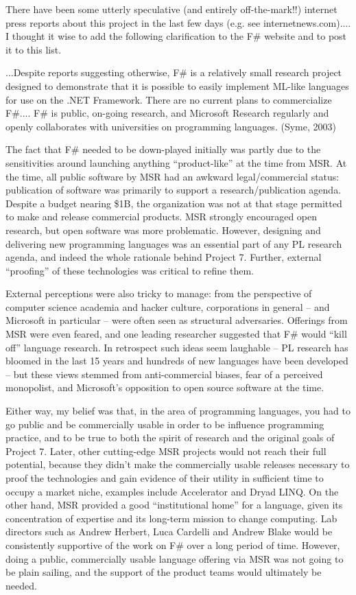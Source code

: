 \documentclass[acmsmall,review]{acmart}\settopmatter{printfolios=true,printccs=false,printacmref=false}
\begin{document}
\begin{verbquote}
There have been some utterly speculative (and entirely off-the-mark!!) internet press reports about this project in the last few days (e.g. see internetnews.com).... I thought it wise to add the following clarification to the F\# website and to post it to this list.

...Despite reports suggesting otherwise, F\# is a relatively small research project designed to demonstrate that it is possible to easily implement ML-like languages for use on the .NET Framework.  There are no current plans to commercialize F\#.... F\# is public, on-going research, and Microsoft Research regularly and openly collaborates with universities on programming languages. (Syme, 2003)  
\end{verbquote}

The fact that F\# needed to be down-played initially was partly due to the sensitivities around launching anything “product-like” at the time from MSR. At the time, all public software by MSR had an awkward legal/commercial status: publication of software was primarily to support a research/publication agenda. Despite a budget nearing \$1B, the organization was not at that stage permitted to make and release commercial products.  MSR strongly encouraged open research, but open software was more problematic. However, designing and delivering new programming languages was an essential part of any PL research agenda, and indeed the whole rationale behind Project 7.  Further, external “proofing” of these technologies was critical to refine them. 

External perceptions were also tricky to manage: from the perspective of computer science academia and hacker culture, corporations in general – and Microsoft in particular – were often seen as structural adversaries. Offerings from MSR were even feared, and one leading researcher suggested that F\# would “kill off” language research.  In retrospect such ideas seem laughable – PL research has bloomed in the last 15 years and hundreds of new languages have been developed – but these views stemmed from anti-commercial biases, fear of a perceived monopolist, and Microsoft’s opposition to open source software at the time. 

Either way, my belief was that, in the area of programming languages, you had to go public and be commercially usable in order to be influence programming practice, and to be true to both the spirit of research and the original goals of Project 7. Later, other cutting-edge MSR projects would not reach their full potential, because they didn’t make the commercially usable releases necessary to proof the technologies and gain evidence of their utility in sufficient time to occupy a market niche, examples include Accelerator and Dryad LINQ. On the other hand, MSR provided a good “institutional home” for a language, given its concentration of expertise and its long-term mission to change computing. Lab directors such as Andrew Herbert, Luca Cardelli and Andrew Blake would be consistently supportive of the work on F\# over a long period of time. However, doing a public, commercially usable language offering via MSR was not going to be plain sailing, and the support of the product teams would ultimately be needed.
\end{document}
